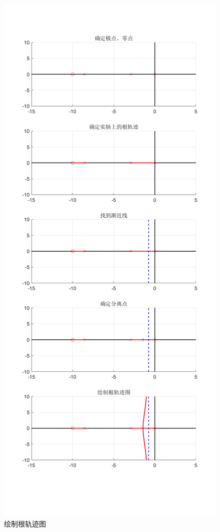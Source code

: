 \begin{figure}[!ht]
    \centering
    \includegraphics[width=0.5\linewidth]{figures/21.png}
    \caption{绘制根轨迹图}
    \label{21}
\end{figure}